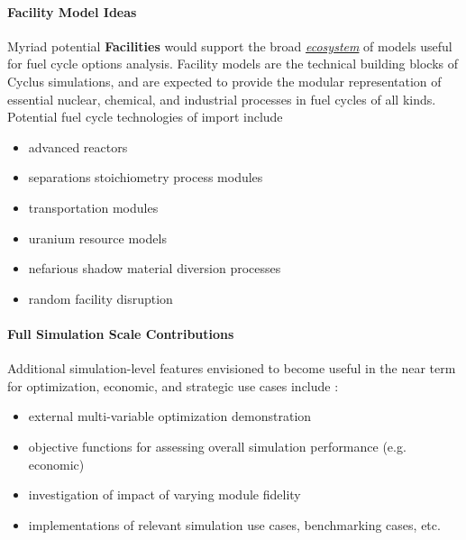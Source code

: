 \documentclass[letterpaper,10pt,english]{sphinxmanual}
\begin{document}
\paragraph{Facility Model Ideas}
\label{basics/roadmap:facility-model-ideas}
Myriad potential \textbf{Facilities} would support the broad {\hyperref[basics/ecosystem::doc]{\emph{ecosystem}}}
of models useful for fuel cycle options analysis. Facility models are the
technical building blocks of Cyclus simulations, and are expected to provide the
modular representation of essential nuclear, chemical, and industrial processes
in fuel cycles of all kinds. Potential fuel cycle technologies of import include
\begin{itemize}
\item {} 
advanced reactors

\item {} 
separations stoichiometry process modules

\item {} 
transportation modules

\item {} 
uranium resource models

\item {} 
nefarious shadow material diversion processes

\item {} 
random facility disruption

\end{itemize}


\paragraph{Full Simulation Scale Contributions}
\label{basics/roadmap:full-simulation-scale-contributions}
Additional simulation-level features envisioned to become useful in the near
term for optimization, economic, and strategic use cases include :
\begin{itemize}
\item {} 
external multi-variable optimization demonstration

\item {} 
objective functions for assessing overall simulation performance (e.g. economic)

\item {} 
investigation of impact of varying module fidelity

\item {} 
implementations of relevant simulation use cases, benchmarking cases, etc.

\end{itemize}
\end{document}
